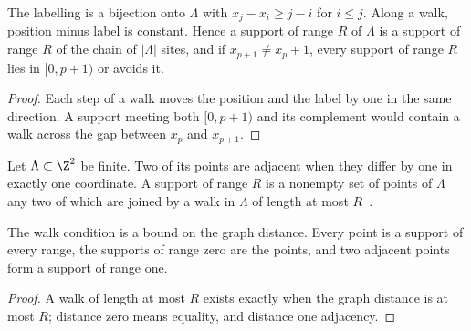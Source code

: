 \begin{lemma}
    \label{lem:sites_line_domain}
    \leanok
    The labelling is a bijection onto $\Lambda$ with $x_j-x_i\ge j-i$ for
    $i\le j$. Along a walk, position minus label is constant. Hence a support
    of range $R$ of $\Lambda$ is a support of range $R$ of the chain of
    $\lvert\Lambda\rvert$ sites, and if $x_{p+1}\neq x_p+1$, every support of
    range $R$ lies in $[0,p+1)$ or avoids it.
\end{lemma}
\begin{proof}\leanok
    Each step of a walk moves the position and the label by one in the same
    direction. A support meeting both $[0,p+1)$ and its complement would
    contain a walk across the gap between $x_p$ and $x_{p+1}$.
\end{proof}

\begin{definition}
    \label{def:sites_plane_domain}
    \leanok
    Let $\Lambda\subset\Z^2$ be finite. Two of its points are adjacent when
    they differ by one in exactly one coordinate. A support of range $R$ is a
    nonempty set of points of $\Lambda$ any two of which are joined by a walk in
    $\Lambda$ of length at most $R$~\cite{OpenAI2026AreaLaw}.
\end{definition}

\begin{lemma}
    \label{lem:sites_plane_domain}
    \leanok
    The walk condition is a bound on the graph distance. Every point is a
    support of every range, the supports of range zero are the points, and two
    adjacent points form a support of range one.
\end{lemma}
\begin{proof}\leanok
    A walk of length at most $R$ exists exactly when the graph distance is at
    most $R$; distance zero means equality, and distance one adjacency.
\end{proof}

